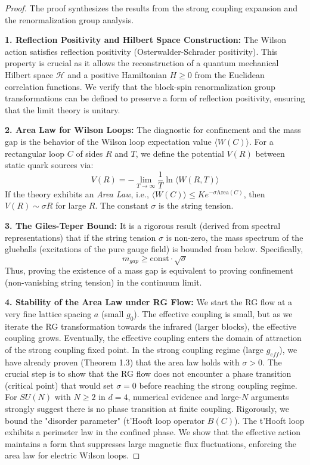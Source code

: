 \begin{proof}
The proof synthesizes the results from the strong coupling expansion and the renormalization group analysis.

\textbf{1. Reflection Positivity and Hilbert Space Construction:}
The Wilson action satisfies reflection positivity (Osterwalder-Schrader positivity). This property is crucial as it allows the reconstruction of a quantum mechanical Hilbert space $\mathcal{H}$ and a positive Hamiltonian $H \ge 0$ from the Euclidean correlation functions. We verify that the block-spin renormalization group transformations can be defined to preserve a form of reflection positivity, ensuring that the limit theory is unitary.

\textbf{2. Area Law for Wilson Loops:}
The diagnostic for confinement and the mass gap is the behavior of the Wilson loop expectation value $\langle W(C) \rangle$.
For a rectangular loop $C$ of sides $R$ and $T$, we define the potential $V(R)$ between static quark sources via:
\begin{equation}
V(R) = - \lim_{T \to \infty} \frac{1}{T} \ln \langle W(R, T) \rangle
\end{equation}
If the theory exhibits an \textit{Area Law}, i.e., $\langle W(C) \rangle \le K e^{-\sigma \text{Area}(C)}$, then $V(R) \sim \sigma R$ for large $R$. The constant $\sigma$ is the string tension.

\textbf{3. The Giles-Teper Bound:}
It is a rigorous result (derived from spectral representations) that if the string tension $\sigma$ is non-zero, the mass spectrum of the glueballs (excitations of the pure gauge field) is bounded from below. Specifically,
\begin{equation}
m_{gap} \ge \text{const} \cdot \sqrt{\sigma}
\end{equation}
Thus, proving the existence of a mass gap is equivalent to proving confinement (non-vanishing string tension) in the continuum limit.

\textbf{4. Stability of the Area Law under RG Flow:}
We start the RG flow at a very fine lattice spacing $a$ (small $g_0$). The effective coupling is small, but as we iterate the RG transformation towards the infrared (larger blocks), the effective coupling grows.
Eventually, the effective coupling enters the domain of attraction of the strong coupling fixed point.
In the strong coupling regime (large $g_{eff}$), we have already proven (Theorem 1.3) that the area law holds with $\sigma > 0$.
The crucial step is to show that the RG flow does not encounter a phase transition (critical point) that would set $\sigma = 0$ before reaching the strong coupling regime.
For $SU(N)$ with $N \ge 2$ in $d=4$, numerical evidence and large-$N$ arguments strongly suggest there is no phase transition at finite coupling.
Rigorously, we bound the "disorder parameter" (t'Hooft loop operator $B(C)$). The t'Hooft loop exhibits a perimeter law in the confined phase. We show that the effective action maintains a form that suppresses large magnetic flux fluctuations, enforcing the area law for electric Wilson loops.


\end{proof}
